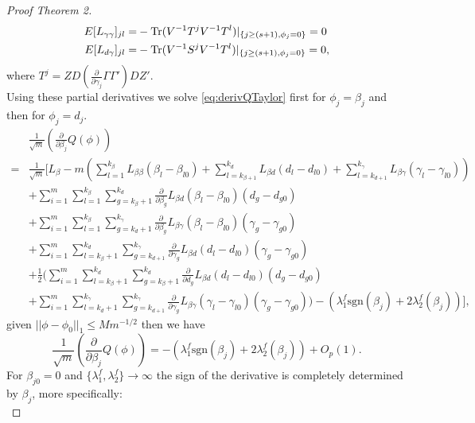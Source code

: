 \begin{proof}[Proof Theorem 2]
\begin{align*}
E[L_{\gamma\gamma}]_{jl}=&-\operatorname{Tr}(V^{-1}T^jV^{-1}T^l)|_{\left\lbrace j\ge (s+1),\phi_j=0\right\rbrace }=0 \nonumber\\
E[L_{d\gamma}]_{jl}=&-\operatorname{Tr}(V^{-1}S^jV^{-1}T^l)|_{\left\lbrace j\ge (s+1),\phi_j=0\right\rbrace }=0 \nonumber,
\end{align*}
where $T^j=ZD(\frac{\partial}{\partial \gamma_j}\Gamma\Gamma')DZ'$.\\ Using these partial derivatives we solve \eqref{eq:derivQTaylor} first for $\phi_j=\beta_j$ and then for $\phi_j=d_j$.
\begin{align*}
 &\frac{1}{\sqrt{m}}\left(\frac{\partial}{\partial \beta_j}Q(\phi)\right)
 \\=
 &\frac{1}{\sqrt{m}} \Biggl [ L_{\beta}
 -m\left(\sum_{l=1}^{k_{\beta}}L_{\beta\beta}(\beta_l-\beta_{l0})
 +\sum_{l=k_{\beta+1}}^{k_{d}}L_{\beta d}(d_l-d_{l0})
 +\sum_{l=k_{d+1}}^{k_{\gamma}}L_{\beta\gamma}(\gamma_l-\gamma_{l0})\right)	\\&
 +\sum_{i=1}^{m}\sum_{l=1}^{k_{\beta}}\sum_{g=k_{\beta}+1}^{k_d}\frac{\partial}{\partial \beta_g}L_{\beta d}(\beta_l-\beta_{l0})(d_g-d_{g0})
 \\&
 +\sum_{i=1}^{m}\sum_{l=1}^{k_{\beta}}\sum_{g=k_{d}+1}^{k_{\gamma}}\frac{\partial}{\partial \beta_g}L_{\beta \gamma}(\beta_l-\beta_{l0})(\gamma_g-\gamma_{g0})
 \\
 &+\sum_{i=1}^{m}\sum_{l=k_{\beta}+1}^{k_d}\sum_{g=k_{d+1}}^{k_{\gamma}}\frac{\partial}{\partial \gamma_g}L_{\beta d}(d_l-d_{l0})(\gamma_g-\gamma_{g0})
 \\
 &+\frac{1}{2}\Biggr(\sum_{i=1}^{m}\sum_{l=k_{\beta}+1}^{k_d}\sum_{g=k_{\beta}+1}^{k_d}\frac{\partial}{\partial d_g}L_{\beta d}(d_l-d_{l0})(d_g-d_{g0})
 \\
 &+\sum_{i=1}^{m}\sum_{l=k_d+1}^{k_{\gamma}}\sum_{g=k_{d+1}}^{k_{\gamma}}\frac{\partial}{\partial \gamma_g}L_{\beta \gamma}(\gamma_l-\gamma_{l0})(\gamma_g-\gamma_{g0})\Biggr)
 -\left(\lambda^f_1\text{sgn}(\beta_j)+2\lambda_2^f(\beta_j)\right)
  \Biggr],
\end{align*}
given $||\phi-\phi_0||_1\le Mm^{-1/2}$ then we have {\footnotesize
\begin{equation}
\frac{1}{\sqrt{m}}\left(\frac{\partial}{\partial \beta_j}Q(\phi)\right)=-\left(\lambda^f_1\text{sgn}(\beta_j)+2\lambda_2^f(\beta_j)\right)+O_p(1).
\end{equation}}
For $\beta_{j0}=0$ and $\lbrace\lambda^f_1,\lambda^f_2\rbrace\rightarrow \infty$ the sign of the derivative is completely determined by $\beta_j$, more specifically:
\begin{equation*}

\end{equation*}
\end{proof}
